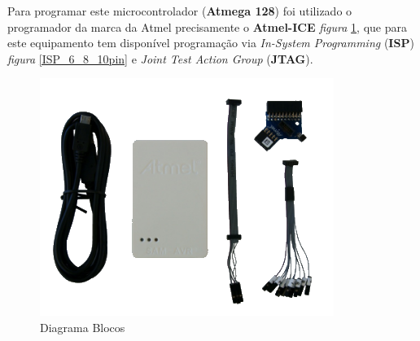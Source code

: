\newpage
Para programar este microcontrolador (\textbf{Atmega 128}) foi utilizado o programador da marca da Atmel precisamente o \textbf{Atmel-ICE} \textit{figura} \ref{Programador_1}, que para este equipamento tem disponível programação via \textit{In-System Programming} (\textbf{ISP}) \textit{figura} \ref{ISP_6_8_10pin} e \textit{Joint Test Action Group} (\textbf{JTAG}).
\begin{minipage}[!b]{.5\linewidth}
	\begin{figure}[H]
		\captionsetup{justification=raggedright,singlelinecheck=false}
		\flushleft
		\includegraphics[scale=0.75]{./image/PESTA/programador/Atmel_ice.png}
		\caption{Diagrama Blocos}
		\label{Programador_1}
	\end{figure}
\end{minipage}
\hspace{.5cm}
